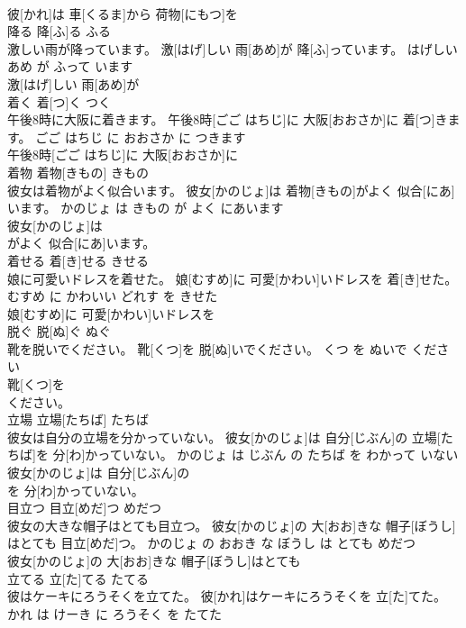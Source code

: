 \documentclass[8pt]{extreport}
\begin{document}
\begin{CJK}{UTF8}{min}
\\	彼[かれ]は 車[くるま]から 荷物[にもつ]を
\\	降る	降[ふ]る	ふる	
\\	激しい雨が降っています。	激[はげ]しい 雨[あめ]が 降[ふ]っています。	はげしい あめ が ふって います	
\\	激[はげ]しい 雨[あめ]が
\\	着く	着[つ]く	つく	
\\	午後8時に大阪に着きます。	午後8時[ごご はちじ]に 大阪[おおさか]に 着[つ]きます。	ごご はちじ に おおさか に つきます	
\\	午後8時[ごご はちじ]に 大阪[おおさか]に
\\	着物	着物[きもの]	きもの	
\\	彼女は着物がよく似合います。	彼女[かのじょ]は 着物[きもの]がよく 似合[にあ]います。	かのじょ は きもの が よく にあいます	
\\	彼女[かのじょ]は
\\	がよく 似合[にあ]います。			
\\	着せる	着[き]せる	きせる	
\\	娘に可愛いドレスを着せた。	娘[むすめ]に 可愛[かわい]いドレスを 着[き]せた。	むすめ に かわいい どれす を きせた	
\\	娘[むすめ]に 可愛[かわい]いドレスを
\\	脱ぐ	脱[ぬ]ぐ	ぬぐ	
\\	靴を脱いでください。	靴[くつ]を 脱[ぬ]いでください。	くつ を ぬいで ください	
\\	靴[くつ]を
\\	ください。			
\\	立場	立場[たちば]	たちば	
\\	彼女は自分の立場を分かっていない。	彼女[かのじょ]は 自分[じぶん]の 立場[たちば]を 分[わ]かっていない。	かのじょ は じぶん の たちば を わかって いない	
\\	彼女[かのじょ]は 自分[じぶん]の
\\	を 分[わ]かっていない。			
\\	目立つ	目立[めだ]つ	めだつ	
\\	彼女の大きな帽子はとても目立つ。	彼女[かのじょ]の 大[おお]きな 帽子[ぼうし]はとても 目立[めだ]つ。	かのじょ の おおき な ぼうし は とても めだつ	
\\	彼女[かのじょ]の 大[おお]きな 帽子[ぼうし]はとても
\\	立てる	立[た]てる	たてる	
\\	彼はケーキにろうそくを立てた。	彼[かれ]はケーキにろうそくを 立[た]てた。	かれ は けーき に ろうそく を たてた	

\end{CJK}
\end{document}
